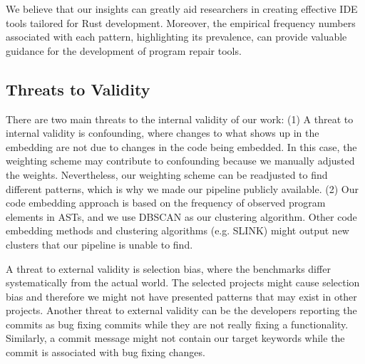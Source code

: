 We believe that our insights can greatly aid researchers in creating effective IDE tools tailored for Rust development. Moreover, the empirical frequency numbers associated with each pattern, highlighting its prevalence, can provide valuable guidance for the development of program repair tools.



\subsection{Threats to Validity}

There are two main threats to the internal validity of our work: (1) A threat to internal validity is confounding, where changes to what shows up in the embedding are not due to changes in the code being embedded. In this case, the weighting scheme may contribute to confounding because we manually adjusted the weights. Nevertheless, our weighting scheme can be readjusted to find different patterns, which is why we made our pipeline publicly available. (2) Our code embedding approach is based on the frequency of observed program elements in ASTs, and we use DBSCAN as our clustering algorithm. Other code embedding methods and clustering algorithms (e.g. SLINK) might output new clusters that our pipeline is unable to find.

A threat to external validity is selection bias, where the benchmarks differ systematically from the actual world. The selected projects might cause selection bias and therefore we might not have presented patterns that may exist in other projects. Another threat to external validity can be the developers reporting the commits as bug fixing commits while they are not really fixing a functionality. Similarly, a commit message might not contain our target keywords while the commit is associated with bug fixing changes.
